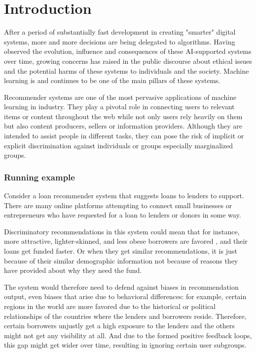 \chapter{Introduction}
\label{introchap}




After a period of substantially fast development in creating "smarter" digital systems, more and more decisions are being delegated to algorithms. Having observed the evolution, influence and consequences of these AI-supported systems over time, growing concerns has raised in the public discourse about ethical issues and the potential harms of these systems to individuals and the society. Machine learning is and continues to be one of the main pillars of these systems. 
 
Recommender systems are one of the most pervasive applications of machine learning in industry. They play a pivotal role in  connecting users to relevant items or content throughout the web while not only users rely heavily on them but also content producers, sellers or information providers. %
Although they are intended to assist people in different tasks, they can pose the risk of implicit or explicit discrimination against individuals or groups especially marginalized groups.

\subsection{Running example}
Consider a loan recommender system that suggests loans to lenders to support. There are many online platforms attempting to connect small businesses or entrepreneurs who have requested for a loan to lenders or donors in some way. 

Discriminatory recommendations in this system could mean that for instance, more attractive, lighter-skinned, and less obese borrowers are favored \cite{JENQ2015234}, and their loans get funded faster. Or when they get similar recommendations, it is just because of their similar demographic information not because of reasons they have provided about why they need the fund.

The system would therefore need to defend against biases in recommendation output, even biases that arise due to behavioral differences: for example, certain regions in the world are more favored due to the historical or political relationships of the countries where the lenders and borrowers reside. Therefore, certain borrowers unjustly get a high exposure to the lenders and the others might not get any visibility at all. And due to the formed positive feedback loops, this gap might get wider over time, resulting in ignoring certain user subgroups.


